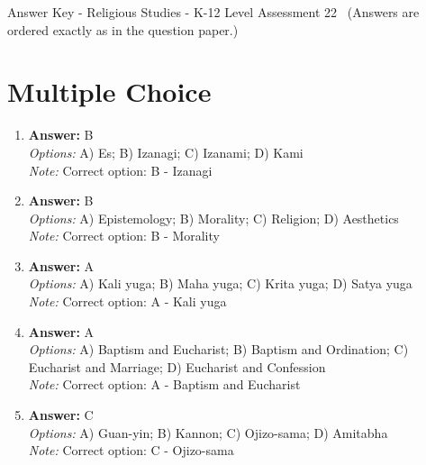 \documentclass[12pt]{article}
\begin{document}
\begin{center}
Answer Key - Religious Studies - K-12 Level Assessment 22 \
\small (Answers are ordered exactly as in the question paper.)
\end{center}

\section*{Multiple Choice}
\begin{enumerate}[label=\arabic*.]
\item \textbf{Answer:} B
\\ \textit{Options:} A) Es; B) Izanagi; C) Izanami; D) Kami
\\ \textit{Note:} Correct option: B - Izanagi
\item \textbf{Answer:} B
\\ \textit{Options:} A) Epistemology; B) Morality; C) Religion; D) Aesthetics
\\ \textit{Note:} Correct option: B - Morality
\item \textbf{Answer:} A
\\ \textit{Options:} A) Kali yuga; B) Maha yuga; C) Krita yuga; D) Satya yuga
\\ \textit{Note:} Correct option: A - Kali yuga
\item \textbf{Answer:} A
\\ \textit{Options:} A) Baptism and Eucharist; B) Baptism and Ordination; C) Eucharist and Marriage; D) Eucharist and Confession
\\ \textit{Note:} Correct option: A - Baptism and Eucharist
\item \textbf{Answer:} C
\\ \textit{Options:} A) Guan-yin; B) Kannon; C) Ojizo-sama; D) Amitabha
\\ \textit{Note:} Correct option: C - Ojizo-sama
\end{enumerate}
\end{document}
